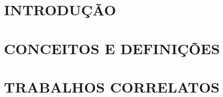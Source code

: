 \documentclass[
	12pt,				%
  oneside,
	a4paper,			%
	chapter=TITLE,		%
	english,			%
	brazil				%
	]{abntex2}
\begin{document}
\renewcommand{\listfigurename}{Lista de Figuras}
\listoffigures*
\cleardoublepage

\renewcommand{\listtablename}{Lista de Tabelas}
\listoftables*
\cleardoublepage



\renewcommand{\contentsname}{Sumário}
\tableofcontents*
\cleardoublepage



\textual
\chapter{INTRODUÇÃO}


\chapter{CONCEITOS E DEFINIÇÕES}


\chapter{TRABALHOS CORRELATOS}

\end{document}
